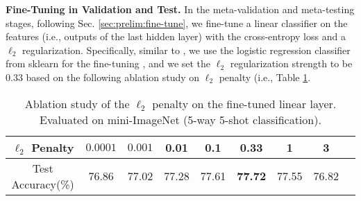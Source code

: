 \documentclass{article}
\begin{document}
\textbf{Fine-Tuning in Validation and Test.} In the meta-validation and meta-testing stages, following Sec. \ref{sec:prelim:fine-tune}, we fine-tune a linear classifier on the features (i.e., outputs of the last hidden layer) with the cross-entropy loss and a $\ell_2$ regularization. Specifically, similar to \citet{tian2020rethink}, we use the logistic regression classifier from sklearn for the fine-tuning \cite{sklearn}, and we set the $\ell_2$ regularization strength to be $0.33$ based on the following ablation study on $\ell_2$ penalty (i.e., Table \ref{tab:l2}.
\begin{table}[b]
    \centering
    \setlength\tabcolsep{1.7pt}
    \begin{tabular}{c c c c c c c c c}
{\small $\ell_2$ Penalty}  &\small $0.0001$& \small{$0.001$}& \small{0.01}& \small{0.1} & \small{0.33} & \small{1} & \small{3}\\
        \midrule
        {\small Test Accuracy(\%)} & \small 76.86 & \small 77.02 & \small 77.28 & \small 77.61 &\small \textbf{77.72} & \small 77.55 &\small 76.82\\
\end{tabular}
    \caption{Ablation study of the $\ell_2$ penalty on the fine-tuned linear layer. Evaluated on mini-ImageNet (5-way 5-shot classification).
}\label{tab:l2}
\end{table}    

\nocite{finn2019online,provable-gbml,adaptive-GBML,hu2020biased,xu2020meta}
\nocite{maml_nonconvex,ji2020multistep,imaml,zhou2019metalearning}
\end{document}
